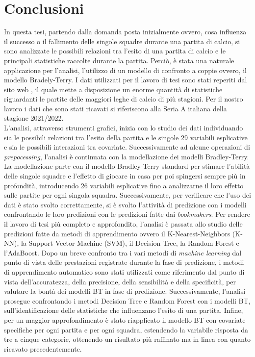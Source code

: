 \chapter{Conclusioni}
\label{cap:conclusioni}

In questa tesi, partendo dalla domanda posta inizialmente ovvero, cosa influenza il successo o il fallimento delle singole squadre durante una partita di calcio, si sono analizzate le possibili relazioni tra l'esito di una partita di calcio e le principali statistiche raccolte durante la partita. Perciò, è stata una naturale applicazione per l'analisi, l'utilizzo di un modello di confronto a coppie ovvero, il modello Bradely-Terry. I dati utilizzati per il lavoro di tesi sono stati reperiti dal sito web \textit{\cite{fbref}}, il quale mette a disposizione un enorme quantità di statistiche riguardanti le partite delle maggiori leghe di calcio di più stagioni. Per il nostro lavoro i dati che sono stati ricavati si riferiscono alla Seria A italiana della stagione 2021/2022.\\
L'analisi, attraverso strumenti grafici, inizia con lo studio dei dati individuando sia le possibili relazioni tra l'esito della partita e le singole 29 variabili esplicative e sia le possibili interazioni tra covariate. Successivamente ad alcune operazioni di \emph{prepocessing}, l'analisi è continuata con la modellazione dei modelli Bradley-Terry. La modellazione parte con il modello Bradley-Terry standard per stimare l'abilità delle singole squadre e l'effetto di giocare in casa per poi spingersi sempre più in profondità, introducendo 26 variabili esplicative fino a analizzarne il loro effetto sulle partite per ogni singola squadra. Successivamente, per verificare che l'uso dei dati è stato svolto correttamente, si è svolto l'attività di predizione con i modelli confrontando le loro predizioni con le predizioni fatte dai \emph{bookmakers}. Per rendere il lavoro di tesi più completo e approfondito, l'analisi è passata allo studio delle predizioni fatte da metodi di apprendimento ovvero il K-Nearest-Neighbors (K-NN), la Support Vector Machine (SVM), il Decision Tree, la Random Forest e l'AdaBoost. Dopo un breve confronto tra i vari metodi di \emph{machine learning} dal punto di vista delle prestazioni registrate durante la fase di predizione, i metodi di apprendimento automatico sono stati utilizzati come riferimento dal punto di vista dell'accuratezza, della precisione, della sensibilità e della specificità, per valutare la bontà dei modelli BT in fase di predizione. Successivamente, l'analisi prosegue confrontando i metodi Decision Tree e Random Forest con i modelli BT, sull'identificazione delle statistiche che influenzano l'esito di una partita. Infine, per un maggior approfondimento è stato riapplicato il modello BT con covariate specifiche per ogni partita e per ogni squadra, estendendo la variabile risposta da tre a cinque categorie, ottenendo un risultato più raffinato ma in linea con quanto ricavato precedentemente.\\
